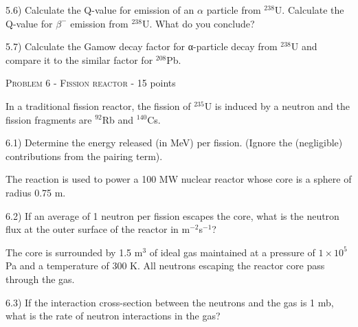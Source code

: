 \documentclass[a4paper,11pt]{report}
\begin{document}
5.6) Calculate the Q-value for emission of an $\alpha$ particle from $^{238}$U. Calculate the Q-value for $\beta^-$ emission from $^{238}$U. What do you conclude?

5.7) Calculate the Gamow decay factor for α-particle decay from $^{238}$U and compare it to the similar factor for $^{208}$Pb.

\vspace{1cm}

{\large \textsc{Problem 6 - Fission reactor} - 15 points}

In a traditional fission reactor, the fission of $^{235}$U is induced by a neutron and the fission fragments are $^{92}$Rb and $^{140}$Cs.

6.1) Determine the energy released (in MeV) per fission. (Ignore the (negligible) contributions from the pairing term).

The reaction is used to power a 100 MW nuclear reactor whose core is a sphere of radius 0.75 m. 

6.2) If an average of 1 neutron per fission escapes the core, what is the neutron flux at the outer surface of the reactor in m$^{-2}$s$^{−1}$?

The core is surrounded by 1.5 m$^3$ of ideal gas maintained at a pressure of $1\times 10^5$ Pa and a temperature of 300 K. All neutrons escaping the reactor core pass through the gas.

6.3) If the interaction cross-section between the neutrons and the gas is 1 mb, what is the rate of neutron interactions in the gas?
\end{document}
